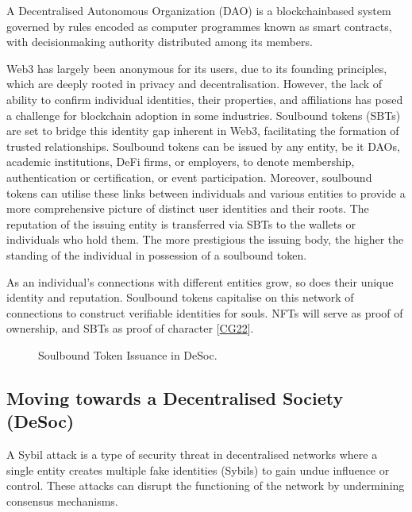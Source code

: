 \documentclass[letterpaper,10pt,english]{jupyterBook}
\let\sphinxpxdimen\pdfpxdimen\else\newdimen\sphinxpxdimen
\begin{document}
\begin{sphinxShadowBox}

\sphinxAtStartPar
A Decentralised Autonomous Organization (DAO) is a blockchain\sphinxhyphen{}based system governed by rules encoded as computer programmes known as smart contracts, with decision\sphinxhyphen{}making authority distributed among its members.
\end{sphinxShadowBox}

\sphinxAtStartPar
Web3 has largely been anonymous for its users, due to its founding principles, which are deeply rooted in privacy and decentralisation. However, the lack of ability to confirm individual identities, their properties, and affiliations has posed a challenge for blockchain adoption in some industries. Soulbound tokens (SBTs) are set to bridge this identity gap inherent in Web3, facilitating the formation of trusted relationships. Soulbound tokens can be issued by any entity, be it DAOs, academic institutions, DeFi firms, or employers, to denote membership, authentication or certification, or event participation. Moreover, soulbound tokens can utilise these links between individuals and various entities to provide a more comprehensive picture of distinct user identities and their roots. The reputation of the issuing entity is transferred via SBTs to the wallets or individuals who hold them. The more prestigious the issuing body, the higher the standing of the individual in possession of a soulbound token.

\sphinxAtStartPar
As an individual’s connections with different entities grow, so does their unique identity and reputation. Soulbound tokens capitalise on this network of connections to construct verifiable identities for souls. NFTs will serve as proof of ownership, and SBTs as proof of character {[}\hyperlink{cite.SBT/SBT:id80}{CG22}{]}.

\begin{figure}[htbp]
\centering
\capstart

\noindent\sphinxincludegraphics[width=1055\sphinxpxdimen,height=785\sphinxpxdimen]{{USBTDiagram3.drawio}.png}
\caption{Soulbound Token Issuance in DeSoc.}\label{\detokenize{SBT/SBT:sbt-diagram}}\end{figure}


\subsection{Moving towards a Decentralised Society (DeSoc)}
\label{\detokenize{SBT/SBT:moving-towards-a-decentralised-society-desoc}}
\begin{sphinxShadowBox}

\sphinxAtStartPar
A Sybil attack is a type of security threat in decentralised networks where a single entity creates multiple fake identities (Sybils) to gain undue influence or control. These attacks can disrupt the functioning of the network by undermining consensus mechanisms.
\end{sphinxShadowBox}
\end{document}
